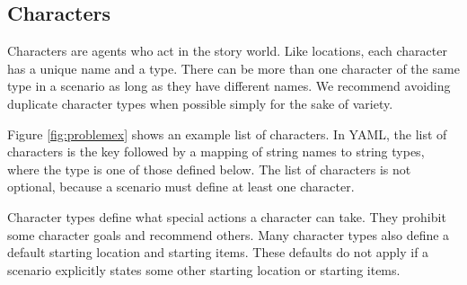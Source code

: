 \documentclass{nilreport}
\begin{document}



\newpage

\subsection{Characters} \label{sec:characters}

Characters are agents who act in the story world. Like locations, each character has a unique name and a type. There can be more than one character of the same type in a scenario as long as they have different names. We recommend avoiding duplicate character types when possible simply for the sake of variety.

Figure \ref{fig:problemex} shows an example list of characters. In YAML, the list of characters is the key  followed by a mapping of string names to string types, where the type is one of those defined below. The list of characters is not optional, because a scenario must define at least one character.

Character types define what special actions a character can take. They prohibit some character goals and recommend others. Many character types also define a default starting location and starting items. These defaults do not apply if a scenario explicitly states some other starting location or starting items.
\end{document}
